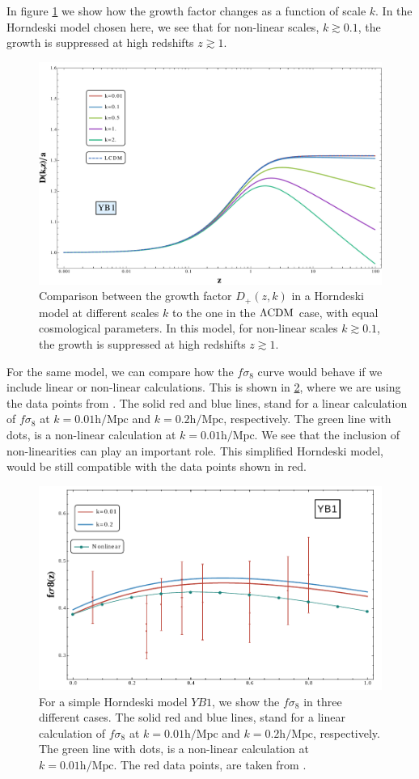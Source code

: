 In figure \cref{fig:change-Dplus-Y} we show how the growth factor 
changes as a function of scale $k$. In the Horndeski model chosen here, we see that
for non-linear scales, $k \gtrsim 0.1$, the growth 
is suppressed at high redshifts $z\gtrsim 1$.
\begin{figure}[tbph]
	\centering
	\includegraphics[width=0.7\linewidth]{Chapters/resummation-plots/Dgrowth-YB1}
	\caption[Growth factor in Horndeski.]{Comparison between the growth factor $D_{+}(z,k)$ in a Horndeski model at different
	scales $k$ to the one in the $\Lambda\mathrm{CDM}$ case, with equal cosmological parameters. In this model, for non-linear scales $k \gtrsim 0.1$, the growth 
is suppressed at high redshifts $z\gtrsim 1$.}
	\label{fig:change-Dplus-Y}
\end{figure}
For the same model, we can compare how the $f \sigma_{8}$ curve would behave if we include linear or non-linear calculations. This is
shown in \cref{fig:change-fsigma8-Y}, where we are using the data points from . 
The solid red and blue lines, stand for a linear calculation of $f \sigma_{8}$ at $k=0.01 \mathrm{h/Mpc}$ and 
$k=0.2 \mathrm{h/Mpc}$, respectively. The green line with dots, is a non-linear calculation at  $k=0.01 \mathrm{h/Mpc}$.
We see that the inclusion of non-linearities can play an important role. This simplified Horndeski model, would be still compatible
with the data points shown in red.
\begin{figure}[tbph]
	\centering
	\includegraphics[width=0.7\linewidth]{Chapters/resummation-plots/fsigma8plot-preliminary-YB1.png}
	\caption[$f \sigma_{8}$ in Horndeski.]{For a simple Horndeski model $YB1$,
		 we show the $f \sigma_{8}$ in three different cases. The solid red and blue lines, stand for a linear calculation of $f \sigma_{8}$ 
		 at $k=0.01 \mathrm{h/Mpc}$ and 
		$k=0.2 \mathrm{h/Mpc}$, respectively. The green line with dots, is a non-linear calculation at  $k=0.01 \mathrm{h/Mpc}$. The red data points,
	are taken from .}
	\label{fig:change-fsigma8-Y}
\end{figure}
